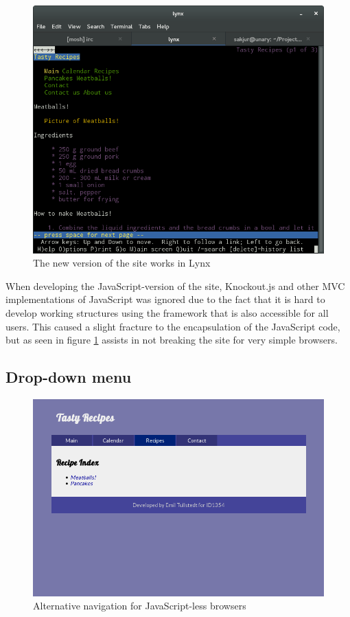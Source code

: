 \documentclass[a4paper]{scrartcl}
\begin{document}
\begin{figure}[!h]
  \begin{center}
    \includegraphics[scale=0.3]{lynxjavascript.png}
    \caption{The new version of the site works in Lynx}
    \label{fig:lynxjs}
  \end{center}
\end{figure}

When developing the JavaScript-version of the site, Knockout.js and other MVC implementations of JavaScript was ignored due to the fact that it is hard to develop working structures using the framework that is also accessible for all users. This caused a slight fracture to the encapsulation of the JavaScript code, but as seen in figure \ref{fig:lynxjs} assists in not breaking the site for very simple browsers.

\subsection{Drop-down menu}

\begin{figure}[!h]
  \begin{center}
    \includegraphics[scale=0.3]{noscript_recipe.png}
    \caption{Alternative navigation for JavaScript-less browsers}
    \label{fig:noscript}
  \end{center}
\end{figure}
\end{document}
